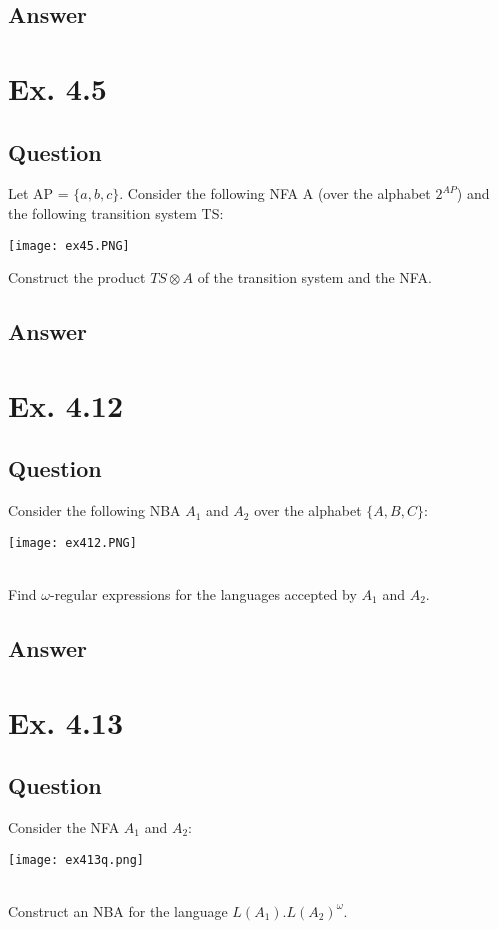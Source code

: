 \documentclass[12pt]{article}
\begin{document}
\subsection*{Answer}

\section*{Ex. 4.5}
\subsection*{Question}
Let AP = $\{ a, b, c \}$. Consider the following NFA A (over the alphabet $2^{AP}$) and
the following transition system TS:\\
\begin{centering}
	\texttt{[image: ex45.PNG]}
\end{centering}
Construct the product $TS \otimes A$ of the transition system and the NFA.

\subsection*{Answer}

\newpage
\section*{Ex. 4.12}
\subsection*{Question}
Consider the following NBA $A_1$ and $A_2$ over the alphabet $\{ A,B,C \}$:\\
\begin{centering}
	\texttt{[image: ex412.PNG]}
\end{centering}\\
Find $\omega$-regular expressions for the languages accepted by $A_1$ and $A_2$.

\subsection*{Answer}

\newpage

\section*{Ex. 4.13}
\subsection*{Question}
Consider the NFA $A_1$ and $A_2$:\\
\begin{centering}
	\texttt{[image: ex413q.png]}
\end{centering}\\
Construct an NBA for the language $L(A_1).L(A_2)^\omega$.
\end{document}
